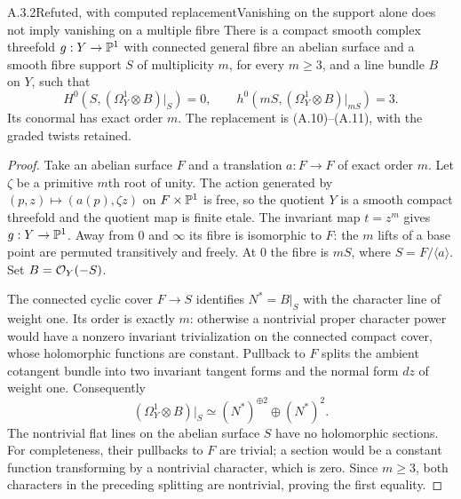 \begin{statement}{A.3.2}{Refuted, with computed replacement}{Vanishing on the support alone does not imply vanishing on a multiple fibre}
There is a compact smooth complex threefold $g:Y\to\mathbb P^1$ with connected general fibre an abelian surface and a smooth fibre support $S$ of multiplicity $m$, for every $m\ge3$, and a line bundle $B$ on $Y$, such that
\[
H^0(S,(\Omega_Y^1\otimes B)|_S)=0,
\qquad h^0(mS,(\Omega_Y^1\otimes B)|_{mS})=3.
\tag{A.12}
\]
Its conormal has exact order $m$. The replacement is (A.10)--(A.11), with the graded twists retained.
\end{statement}
\begin{proof}
Take an abelian surface $F$ and a translation $a:F\to F$ of exact order $m$. Let $\zeta$ be a primitive $m$th root of unity. The action generated by $(p,z)\mapsto(a(p),\zeta z)$ on $F\times\mathbb P^1$ is free, so the quotient $Y$ is a smooth compact threefold and the quotient map is finite etale. The invariant map $t=z^m$ gives $g:Y\to\mathbb P^1$. Away from $0$ and $\infty$ its fibre is isomorphic to $F$: the $m$ lifts of a base point are permuted transitively and freely. At $0$ the fibre is $mS$, where $S=F/\langle a\rangle$. Set $B=\mathcal O_Y(-S)$.

The connected cyclic cover $F\to S$ identifies $N^*=B|_S$ with the character line of weight one. Its order is exactly $m$: otherwise a nontrivial proper character power would have a nonzero invariant trivialization on the connected compact cover, whose holomorphic functions are constant. Pullback to $F$ splits the ambient cotangent bundle into two invariant tangent forms and the normal form $dz$ of weight one. Consequently
\[
 (\Omega_Y^1\otimes B)|_S\simeq (N^*)^{\oplus2}\oplus(N^*)^2.
\]
The nontrivial flat lines on the abelian surface $S$ have no holomorphic sections. For completeness, their pullbacks to $F$ are trivial; a section would be a constant function transforming by a nontrivial character, which is zero. Since $m\ge3$, both characters in the preceding splitting are nontrivial, proving the first equality.


\end{proof}

